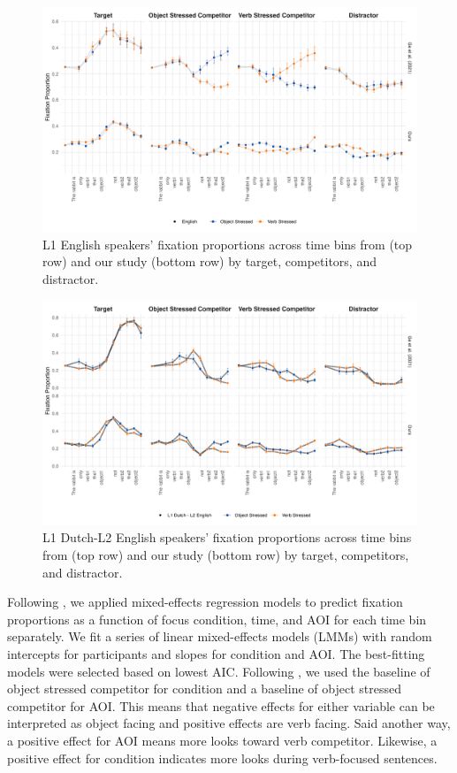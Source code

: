 \begin{figure}[H]  %
    \centering
    \includegraphics[width=\textwidth,height=\textheight,keepaspectratio]{viz/english_fix.png}
    \caption{L1 English speakers' fixation proportions across time bins from \cite{Ge2021} (top row) and our study (bottom row) by target, competitors, and distractor.}
    \label{fig:english_fix}
\end{figure}

\begin{figure}  %
    \centering
    \includegraphics[width=\textwidth,height=\textheight,keepaspectratio]{viz/dutch_fix.png}
    \caption{L1 Dutch-L2 English speakers' fixation proportions across time bins from \cite{Ge2021} (top row) and our study (bottom row) by target, competitors, and distractor.}
    \label{fig:dutch_fix}
\end{figure}

Following \cite{Ge2021}, we applied mixed-effects regression models to predict fixation proportions as a function of focus condition, time, and AOI for each time bin separately. We fit a series of linear mixed-effects models (LMMs) with random intercepts for participants and slopes for condition and AOI. The best-fitting models were selected based on lowest AIC. Following \cite{Ge2021}, we used the baseline of object stressed competitor for condition and a baseline of object stressed competitor for AOI. This means that negative effects for either variable can be interpreted as object facing and positive effects are verb facing. Said another way, a positive effect for AOI means more looks toward verb competitor. Likewise, a positive effect for condition indicates more looks during verb-focused sentences.

